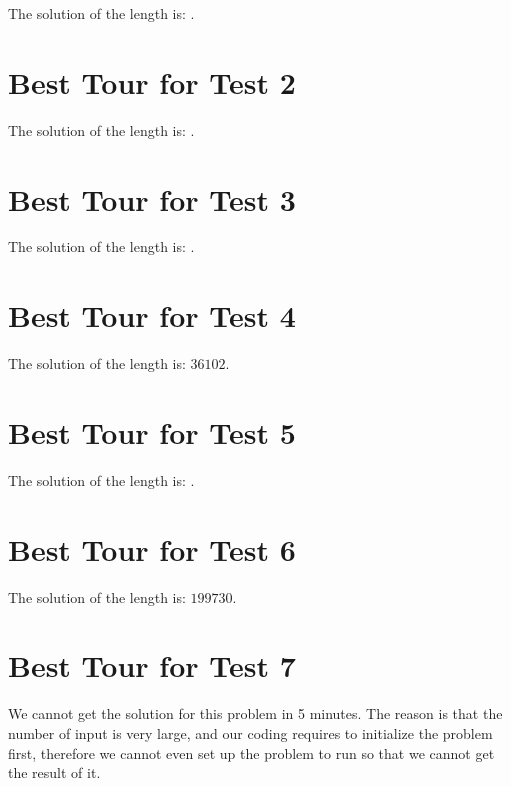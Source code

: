 \documentclass[11pt]{scrreprt}
\begin{document}
The solution of the length is: $ $.


\section{Best Tour for Test 2}

The solution of the length is: $ $.


\section{Best Tour for Test 3}

The solution of the length is: $ $.


\section{Best Tour for Test 4}

The solution of the length is: $36102$.


\section{Best Tour for Test 5}

The solution of the length is: $ $.


\section{Best Tour for Test 6}

The solution of the length is: $199730$.


\section{Best Tour for Test 7}

We cannot get the solution for this problem in 5 minutes. The reason is that the number of input is very large, and our coding requires to initialize the problem first, therefore we cannot even set up the problem to run so that we cannot get the result of it.
\end{document}

